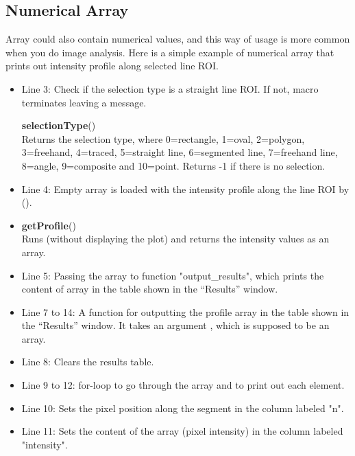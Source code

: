 \subsection{Numerical Array}
\label{subsec:numericalarray}
Array could also contain numerical values, and this way of usage is more common when you do image analysis. Here is a simple example of numerical array that prints out intensity profile along selected line ROI. 



\begin{itemize}
\item Line 3: Check if the selection type is a straight line ROI. If not, macro terminates leaving a message. 

\begin{indentCom}
\textbf{selectionType}()\\ 
Returns the selection type, where 0=rectangle, 1=oval, 2=polygon, 3=freehand, 4=traced, 5=straight line, 6=segmented line, 7=freehand line, 8=angle, 9=composite and 10=point. Returns -1 if there is no selection.
\end{indentCom}

\item Line 4: Empty array  is loaded with the intensity profile along the line ROI by ().
\item
\begin{indentCom}
\textbf{getProfile}()\\
Runs  (without displaying the plot) and returns the intensity values as an array.
\end{indentCom}

\item Line 5: Passing the array  to function "output\_results", which prints the content of array in the table shown in the ``Results'' window. 

\item Line 7 to 14: A function for outputting the profile array in the table shown in the ``Results'' window. It takes an argument , which is supposed to be an array. 
\item Line 8: Clears the results table. 
\item Line 9 to 12: for-loop to go through the array and to print out each element. 
\item Line 10: Sets the pixel position along the segment in the column labeled "n". 
\item Line 11: Sets the content of the array (pixel intensity) in the column labeled "intensity".


\end{itemize}
